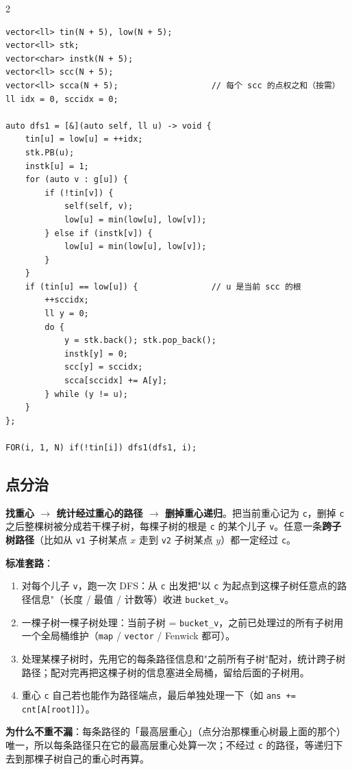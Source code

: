 \begin{multicols*}{2}
		\begin{verbatim}
vector<ll> tin(N + 5), low(N + 5);
vector<ll> stk;
vector<char> instk(N + 5);
vector<ll> scc(N + 5);
vector<ll> scca(N + 5);                   // 每个 scc 的点权之和（按需）
ll idx = 0, sccidx = 0;

auto dfs1 = [&](auto self, ll u) -> void {
    tin[u] = low[u] = ++idx;
    stk.PB(u);
    instk[u] = 1;
    for (auto v : g[u]) {
        if (!tin[v]) {
            self(self, v);
            low[u] = min(low[u], low[v]);
        } else if (instk[v]) {
            low[u] = min(low[u], low[v]);
        }
    }
    if (tin[u] == low[u]) {               // u 是当前 scc 的根
        ++sccidx;
        ll y = 0;
        do {
            y = stk.back(); stk.pop_back();
            instk[y] = 0;
            scc[y] = sccidx;
            scca[sccidx] += A[y];
        } while (y != u);
    }
};

FOR(i, 1, N) if(!tin[i]) dfs1(dfs1, i);
		\end{verbatim}


		\subsection{点分治}

		\textbf{找重心 $\to$ 统计经过重心的路径 $\to$ 删掉重心递归}。把当前重心记为 \texttt{c}，删掉 \texttt{c} 之后整棵树被分成若干棵子树，每棵子树的根是 \texttt{c} 的某个儿子 \texttt{v}。任意一条\textbf{跨子树路径}（比如从 \texttt{v1} 子树某点 $x$ 走到 \texttt{v2} 子树某点 $y$）都一定经过 \texttt{c}。

		\textbf{标准套路}：

		\begin{enumerate}
			\item 对每个儿子 \texttt{v}，跑一次 DFS：从 \texttt{c} 出发把"以 \texttt{c} 为起点到这棵子树任意点的路径信息"（长度 / 最值 / 计数等）收进 \texttt{bucket\_v}。
			\item 一棵子树一棵子树处理：当前子树 = \texttt{bucket\_v}，之前已处理过的所有子树用一个全局桶维护（\texttt{map} / \texttt{vector} / Fenwick 都可）。
			\item 处理某棵子树时，先用它的每条路径信息和"之前所有子树"配对，统计跨子树路径；配对完再把这棵子树的信息塞进全局桶，留给后面的子树用。
			\item 重心 \texttt{c} 自己若也能作为路径端点，最后单独处理一下（如 \texttt{ans += cnt[A[root]]}）。
		\end{enumerate}

		\textbf{为什么不重不漏}：每条路径的「最高层重心」（点分治那棵重心树最上面的那个）唯一，所以每条路径只在它的最高层重心处算一次；不经过 \texttt{c} 的路径，等递归下去到那棵子树自己的重心时再算。


\end{multicols*}
